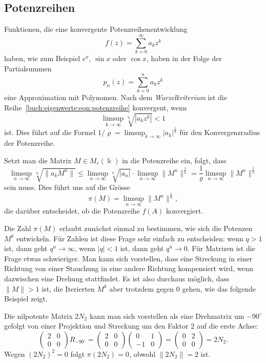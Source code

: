 %
%
\subsection{Potenzreihen
\label{buch:subsection:potenzreihen}}
Funktionen, die eine konvergente Potenzreihenentwicklung
\begin{equation}
f(z)
=
\sum_{k=0}^\infty a_kz^k
\label{buch:eigenwerte:eqn:potenzreihe}
\end{equation}
haben, wie
zum Beispiel $e^x$, $\sin x$ oder $\cos x$, haben in der Folge
der Partialsummen
\[
p_n(z) = \sum_{k=0}^n a_kz^k
\]
eine Approximation mit Polynomen.
Nach dem {\em Wurzelkriterium} ist die
Reihe~\eqref{buch:eigenwerte:eqn:potenzreihe}
konvergent, wenn 
\[
\limsup_{k\to\infty} \sqrt[n]{|a_kz^k|} < 1
\]
ist.
%
Dies führt auf die Formel $1/\varrho = \limsup_{k\to\infty}|a_k|^{\frac1k}$ 
für den Konvergenzradius der Potenzreihe.

Setzt man die Matrix $M\in M_r(\Bbbk)$ in die Potenzreihe ein,
folgt, dass
\[
\limsup_{n\to\infty} \sqrt[n]{\|a_kM^n\|}
\le
\limsup_{n\to\infty} \sqrt[n]{|a_n|}
\cdot
\limsup_{n\to\infty} \|M^n\|^{\frac1n}
=
\frac{1}{\varrho}
\limsup_{n\to\infty} \|M^n\|^{\frac1n}
\]
sein muss.
Dies führt uns auf die Grösse
\begin{equation}
\pi(M)
=
\limsup_{n\to\infty} \|M^n\|^\frac1n,
\label{buch:eqn:gelfand-grenzwert}
\end{equation}
%
die
darüber entscheidet, ob die Potenzreihe $f(A)$ konvergiert.

Die Zahl $\pi(M)$ erlaubt zunächst einmal zu bestimmen, wie
sich die Potenzen $M^k$ entwickeln.
Für Zahlen ist diese Frage sehr einfach zu entscheiden: wenn $q>1$ ist,
dann geht $q^n\to\infty$, wenn $|q|<1$ ist, dann geht $q^n\to 0$.
Für Matrizen ist die Frage etwas schwieriger.
Man kann sich vorstellen, dass eine Streckung in einer Richtung
von einer Stauchung in eine andere Richtung kompensiert wird, wenn
dazwischen eine Drehung stattfindet.
Es ist also durchaus möglich, dass $\|M\|>1$ ist, die
Iterierten $M^k$ aber trotzdem gegen $0$ gehen, wie das folgende
Beispiel zeigt.

\begin{beispiel}
Die nilpotente Matrix $2N_2$ kann man sich vorstellen als eine Drehmatrix
um $-90^\circ$ gefolgt von einer Projektion und Streckung um den Faktor
$2$ auf die erste Achse:
\[
\begin{pmatrix}2&0\\0&0\end{pmatrix}
R_{-90^\circ}
=
\begin{pmatrix}2&0\\0&0\end{pmatrix}
\begin{pmatrix} 0&1\\-1&0 \end{pmatrix}
=
\begin{pmatrix}
0&2\\0&0
\end{pmatrix}
=2N_2.
\]
Wegen $(2N_2)^2=0$ folgt $\pi(2N_2)=0$, obwohl $\|2N_2\|=2$ ist.
\end{beispiel}

